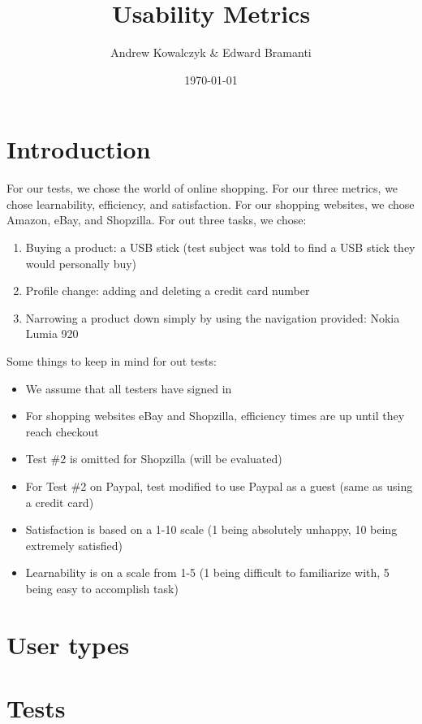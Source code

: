 \documentclass[11pt, oneside]{article}   	%
\title{Usability Metrics}
\author{Andrew Kowalczyk \& Edward Bramanti}
\date{\today}							%
\begin{document}
\maketitle

\section{Introduction}
For our tests, we chose the world of online shopping. For our three metrics, we chose learnability, efficiency, and satisfaction. For our shopping websites, we chose Amazon, eBay, and Shopzilla. For out three tasks, we chose:

\begin{enumerate}
    \item Buying a product: a USB stick (test subject was told to find a USB stick they would personally buy)
    \item Profile change: adding and deleting a credit card number
    \item Narrowing a product down simply by using the navigation provided: Nokia Lumia 920
\end{enumerate}

Some things to keep in mind for out tests:

\begin{itemize}
    \item We assume that all testers have signed in
    \item For shopping websites eBay and Shopzilla, efficiency times are up until they reach checkout
    \item Test \#2 is omitted for Shopzilla (will be evaluated)
    \item For Test \#2 on Paypal, test modified to use Paypal as a guest (same as using a credit card)
    \item Satisfaction is based on a 1-10 scale (1 being absolutely unhappy, 10 being extremely satisfied)
    \item Learnability is on a scale from 1-5 (1 being difficult to familiarize with, 5 being easy to accomplish task)
\end{itemize}

\section{User types}

\section{Tests}
\end{document}
